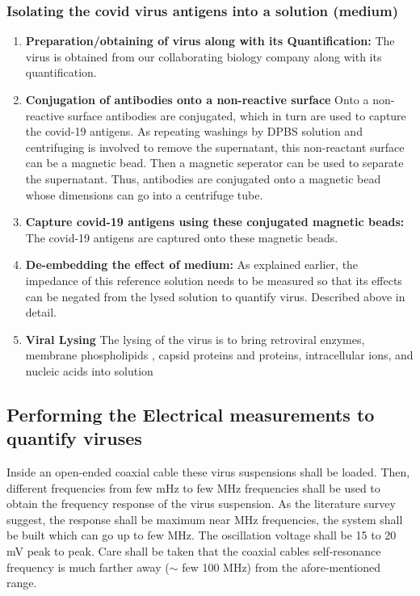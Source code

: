 \documentclass{FR16}
\begin{document}
\subsubsection{Isolating the covid virus antigens into a solution (medium)}
    \begin{enumerate}
        \item \textbf{Preparation/obtaining of virus along with its Quantification:} The virus is obtained from our collaborating biology company along with its quantification.
    
        \item \textbf{Conjugation of antibodies onto a non-reactive surface} Onto a non-reactive surface antibodies are conjugated, which in turn are used to capture the covid-19 antigens. As repeating washings by DPBS solution and centrifuging is involved to remove the supernatant, this non-reactant surface can be a magnetic bead. Then a magnetic seperator can be used to separate the supernatant. Thus, antibodies are conjugated onto a magnetic bead whose dimensions can go into a centrifuge tube. 
        
        \item \textbf{Capture covid-19 antigens using these conjugated magnetic beads:} The covid-19  antigens are captured onto these magnetic beads.
        
        \item \textbf{De-embedding the effect of medium:} As explained earlier, the impedance of this reference solution needs to be measured so that its effects can be negated from the lysed solution to quantify virus. Described above in detail.
        
        
        \item  \textbf{Viral Lysing} The lysing of the virus is to bring retroviral enzymes, membrane phospholipids , capsid proteins and proteins, intracellular ions,  and nucleic acids into solution
        
    \end{enumerate}


\subsection{Performing the Electrical measurements to quantify viruses} Inside an open-ended coaxial cable these virus suspensions shall be loaded. Then, different frequencies from  few mHz to few MHz frequencies shall be used to obtain the frequency response of the virus suspension. As the literature survey suggest, the response shall be maximum near MHz frequencies, the system shall be built which can go up to few MHz. The oscillation voltage shall be 15 to 20 mV peak to peak. Care shall be taken that the coaxial cables self-resonance frequency is much farther away ($\sim$ few 100 MHz) from the afore-mentioned range. 
\end{document}
